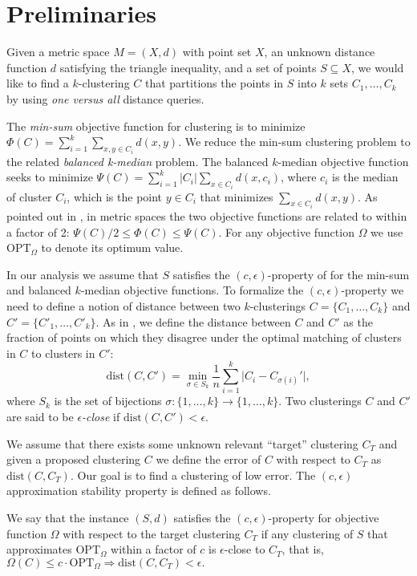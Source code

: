 \documentclass{llncs} \usepackage{algorithm}
\newcommand{\OPT}{\mathrm{OPT}}
\newcommand{\dist}{\mathrm{dist}}
\begin{document}
\section{Preliminaries}

Given a metric space $M=(X,d)$ with point set $X$, an unknown distance function
$d$ satisfying the triangle inequality, and a set of points $S \subseteq X$, we
would like to find a $k$-clustering $C$ that partitions the points in $S$ into
$k$ sets $C_{1},\ldots,C_{k}$ by using \emph{one versus all} distance
queries.

The \emph{min-sum} objective function for clustering is to minimize \linebreak $\Phi(C) = \sum_{i=1}^{k}\sum_{x,y \in C_{i}}d(x,y)$.  We reduce the min-sum clustering problem to the related \emph{balanced k-median} problem.  The balanced $k$-median objective function seeks to minimize $\Psi(C) = \sum_{i=1}^{k}\vert C_{i} \vert \sum_{x \in C_{i}} d(x,c_{i})$, where $c_{i}$ is the median of cluster $C_{i}$, which is the point $y \in C_{i}$ that minimizes $\sum_{x \in C_{i}}d(x,y)$.  As pointed out in \cite{bcr}, in metric spaces the two objective functions are related to within a factor of 2: $\Psi(C)/2 \le \Phi(C) \le \Psi(C)$.  For any objective function $\Omega$ we use $\OPT_{\Omega}$ to denote its optimum value.

In our analysis we assume that $S$ satisfies the $(c,\epsilon)$-property of \cite{bbg} for the min-sum and balanced $k$-median objective functions.  To formalize the $(c,\epsilon)$-property we need to define a notion of distance
between two $k$-clusterings $C = \lbrace C_{1},\ldots,C_{k} \rbrace$ and
$C' = \lbrace C'_{1},\ldots,C'_{k} \rbrace$. As in \cite{bbg}, we define the
distance between $C$ and $C'$ as the fraction of points on which they disagree
under the optimal matching of clusters in $C$ to clusters in $C'$:
\begin{displaymath}
   \dist(C,C') = \min_{\sigma \in S_{k}} \frac{1}{n} \sum_{i=1}^{k} \vert C_{i} - C_{\sigma(i)}' \vert,
\end{displaymath}
where $S_{k}$ is the set of bijections $\sigma\colon \lbrace 1,\ldots,k  \rbrace \rightarrow \lbrace 1,\ldots,k  \rbrace$.  Two clusterings $C$ and $C'$ are said to be \emph{$\epsilon$-close}
if $\dist(C,C') < \epsilon$.

We assume that there exists some unknown relevant ``target'' clustering $C_{T}$ and given a proposed clustering $C$ we define the error of $C$ with respect to $C_{T}$ as $\dist(C,C_{T})$. Our goal is to find a clustering of low error.  The $(c,\epsilon)$ approximation stability property is defined as follows.
\begin{definition}
We say that the instance $(S,d)$ satisfies the $(c,\epsilon)$-property for objective function $\Omega$ with respect to the target clustering $C_T$ if any
clustering of $S$ that approximates $\OPT_{\Omega}$ within a factor of $c$ is
$\epsilon$-close to $C_{T}$, that is,
$
   \Omega(C) \le c \cdot \OPT_{\Omega} \Rightarrow \dist(C,C_{T}) < \epsilon.
$
\end{definition}
\end{document}

